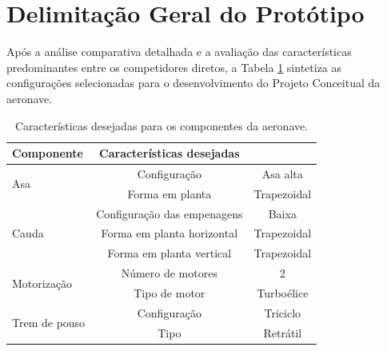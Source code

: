\section{Delimitação Geral do Protótipo}

Após a análise comparativa detalhada e a avaliação das características predominantes entre os competidores diretos, a Tabela \ref{tab:delimitacao_prototipo} sintetiza as configurações selecionadas para o desenvolvimento do Projeto Conceitual da aeronave.

\begin{table}[h!]
\centering
\caption{Características desejadas para os componentes da aeronave.}
\label{tab:delimitacao_prototipo}
\vspace{0.2cm} %
\renewcommand{\arraystretch}{1.2} %
\begin{tabular}{lcc}
\hline
\textbf{Componente} & \textbf{Características desejadas} & \\
\hline
\multirow{2}{*}{Asa} & Configuração & Asa alta \\
 & Forma em planta & Trapezoidal \\
\hline
\multirow{3}{*}{Cauda} & Configuração das empenagens & Baixa \\
 & Forma em planta horizontal & Trapezoidal \\
 & Forma em planta vertical & Trapezoidal \\
\hline
\multirow{2}{*}{Motorização} & Número de motores & 2 \\
 & Tipo de motor & Turboélice \\
\hline
\multirow{2}{*}{Trem de pouso} & Configuração & Triciclo \\
 & Tipo & Retrátil \\
\hline
\end{tabular}
\end{table}

